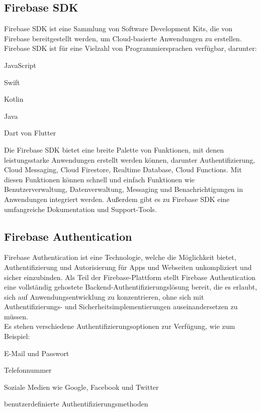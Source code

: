 \subsection{Firebase SDK}
Firebase SDK\cite{firebase_libraries} ist eine Sammlung von Software Development Kits, die von Firebase bereitgestellt werden, um Cloud-basierte Anwendungen zu erstellen.
Firebase SDK ist für eine Vielzahl von Programmiersprachen verfügbar, darunter:
\begin{compactitem}
    \item JavaScript
    \item Swift
    \item Kotlin
    \item Java
    \item Dart von Flutter
\end{compactitem}
Die Firebase SDK bietet eine breite Palette von Funktionen, mit denen leistungsstarke Anwendungen erstellt werden können, darunter Authentifizierung, Cloud Messaging, Cloud Firestore, Realtime Database, Cloud Functions. Mit diesen Funktionen können schnell und einfach Funktionen wie Benutzerverwaltung, Datenverwaltung, Messaging und Benachrichtigungen in Anwendungen integriert werden. Außerdem gibt es zu Firebase SDK eine umfangreiche Dokumentation und Support-Tools.


\subsection{Firebase Authentication}
\author{Sandin Habibovic}

Firebase Authentication\cite{firebase_auth} ist eine Technologie, welche die Möglichkeit bietet, Authentifizierung und Autorisierung für Apps und Webseiten unkompliziert und sicher einzubinden. Als Teil der Firebase-Plattform stellt Firebase Authentication eine vollständig gehostete Backend-Authentifizierungslösung bereit, die es erlaubt, sich auf Anwendungsentwicklung zu konzentrieren, ohne sich mit Authentifizierungs- und Sicherheitsimplementierungen auseinandersetzen zu müssen.
\\
Es stehen verschiedene Authentifizierungsoptionen zur Verfügung, wie zum Beispiel:
\begin{compactitem}
    \item E-Mail und Passwort
    \item Telefonnummer
    \item Soziale Medien wie Google, Facebook und Twitter
    \item benutzerdefinierte Authentifizierungsmethoden
\end{compactitem}


